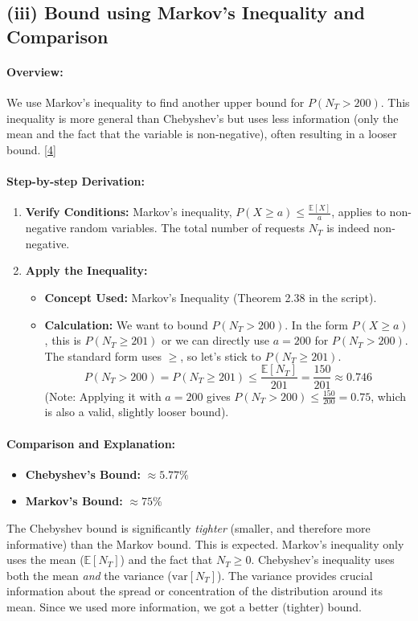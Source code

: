 \documentclass[11pt,a4paper]{article}
\begin{document}
\subsection{(iii) Bound using Markov's Inequality and Comparison}

\paragraph{Overview:}
We use Markov's inequality to find another upper bound for $P(N_T > 200)$. This inequality is more general than Chebyshev's but uses less information (only the mean and the fact that the variable is non-negative), often resulting in a looser bound.
\hyperlink{concept4}{[4]}

\paragraph{Step-by-step Derivation:}
\begin{enumerate}
    \item \textbf{Verify Conditions:} Markov's inequality, $P(X \geq a) \leq \frac{\mathbb{E}[X]}{a}$, applies to non-negative random variables. The total number of requests $N_T$ is indeed non-negative.

    \item \textbf{Apply the Inequality:}
    \begin{itemize}
        \item \textbf{Concept Used:} Markov's Inequality (Theorem 2.38 in the script).
        \item \textbf{Calculation:} We want to bound $P(N_T > 200)$. In the form $P(X \ge a)$, this is $P(N_T \ge 201)$ or we can directly use $a=200$ for $P(N_T > 200)$. The standard form uses $\ge$, so let's stick to $P(N_T \ge 201)$.
        \[
            P(N_T > 200) = P(N_T \geq 201) \leq \frac{\mathbb{E}[N_T]}{201} = \frac{150}{201} \approx 0.746
        \]
        (Note: Applying it with $a=200$ gives $P(N_T > 200) \le \frac{150}{200} = 0.75$, which is also a valid, slightly looser bound).
    \end{itemize}
\end{enumerate}

\paragraph{Comparison and Explanation:}
\begin{itemize}
    \item \textbf{Chebyshev's Bound:} $\approx 5.77\%$
    \item \textbf{Markov's Bound:} $\approx 75\%$
\end{itemize}
The Chebyshev bound is significantly \textit{tighter} (smaller, and therefore more informative) than the Markov bound. This is expected. Markov's inequality only uses the mean ($\mathbb{E}[N_T]$) and the fact that $N_T \ge 0$. Chebyshev's inequality uses both the mean \textit{and} the variance ($\text{var}[N_T]$). The variance provides crucial information about the spread or concentration of the distribution around its mean. Since we used more information, we got a better (tighter) bound.
\end{document}
